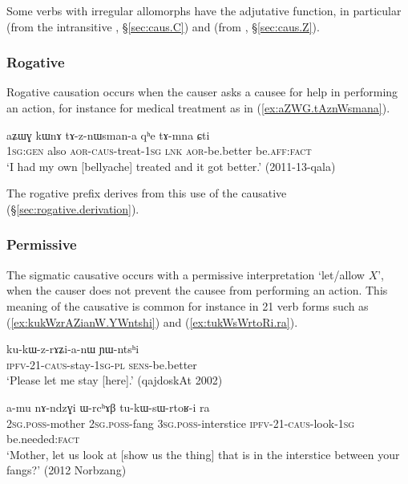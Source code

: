 Some verbs with irregular allomorphs have the adjutative function, in  particular  (from the intransitive , §\ref{sec:caus.C}) and   (from , §\ref{sec:caus.Z}).

\subsubsection{Rogative} \label{sec:sig.caus.rogative}
Rogative causation occurs when the causer asks a causee for help in performing an action, for instance for medical treatment as in (\ref{ex:aZWG.tAznWsmana}). 

\begin{exe}
\ex \label{ex:aZWG.tAznWsmana}
\gll aʑɯɣ kɯnɤ tɤ-z-nɯsman-a qʰe tɤ-mna ɕti \\
\textsc{1sg}:\textsc{gen} also \textsc{aor}-\textsc{caus}-treat-\textsc{1sg} \textsc{lnk} \textsc{aor}-be.better be.\textsc{aff}:\textsc{fact} \\
\glt `I had my own [bellyache] treated and it got better.' (2011-13-qala)
\end{exe}

The rogative  prefix derives from this use of the causative (§\ref{sec:rogative.derivation}). 

\subsubsection{Permissive} \label{sec:sig.caus.permissive} 
The sigmatic causative occurs with a permissive interpretation `let/allow $X$', when the causer does not prevent the causee from performing an action. This meaning of the causative is common for instance in 2\fl{}1 verb forms such as (\ref{ex:kukWzrAZianW.YWntshi}) and (\ref{ex:tukWsWrtoRi.ra}). 

\begin{exe}
\ex \label{ex:kukWzrAZianW.YWntshi}
\gll ku-kɯ-z-rɤʑi-a-nɯ ɲɯ-ntsʰi \\
\textsc{ipfv}-2\fl{}1-\textsc{caus}-stay-\textsc{1sg}-\textsc{pl} \textsc{sens}-be.better \\
\glt `Please let me stay [here].' (qajdoskAt 2002) 
\end{exe}
 
\begin{exe}
\ex \label{ex:tukWsWrtoRi.ra}
\gll a-mu nɤ-ndzɣi ɯ-rcʰɤβ tu-kɯ-sɯ-rtoʁ-i ra \\
\textsc{2sg}.\textsc{poss}-mother \textsc{2sg}.\textsc{poss}-fang \textsc{3sg}.\textsc{poss}-interstice \textsc{ipfv}-2\fl{}1-\textsc{caus}-look-\textsc{1sg} be.needed:\textsc{fact} \\
\glt `Mother, let us look at [show us the thing] that is in the interstice between your fangs?' (2012 Norbzang)
\end{exe}

